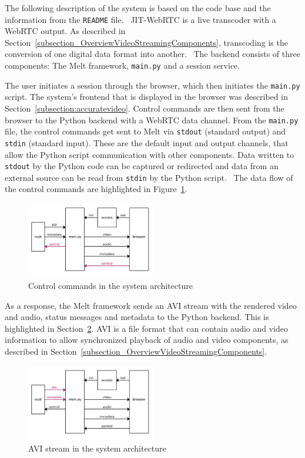 \documentclass[../MasterThesis.tex]{subfiles}
\begin{document}
The following description of the system is based on the code base and the information from the \texttt{README} file.~\cite{RM_Backend}
JIT-WebRTC is a live transcoder with a WebRTC output. As described in Section~\ref{subsection_OverviewVideoStreamingComponents}, transcoding is the conversion of one digital data format into another.~\cite{transcoding}
The backend consists of three components: The Melt framework, \texttt{main.py} and a session service.


The user initiates a session through the browser, which then initiates the \texttt{main.py} script. The system's frontend that is displayed in the browser was described in Section~\ref{subsection:accuratevideo}.
Control commands are then sent from the browser to the Python backend with a WebRTC data channel.
From the \texttt{main.py} file, the control commands get sent to Melt via \texttt{stdout} (standard output) and \texttt{stdin} (standard input). These are the default input and output channels, that allow the Python script communication with other components.
Data written to \texttt{stdout} by the Python code can be captured or redirected and data from an external source can be read from \texttt{stdin} by the Python script.~\cite{python} The data flow of the control commands are highlighted in Figure~\ref{figure:controlcommands}.

\begin{figure}[H]
	\centering
	\includegraphics[width=0.5\textwidth]{IM_control.png}
	\caption{Control commands in the system architecture}
	\label{figure:controlcommands}
\end{figure}


As a response, the Melt framework sends an AVI stream with the rendered video and audio, status messages and metadata to the Python backend. This is highlighted in Section~\ref{figure:avimetadata}.
AVI is a file format that can contain audio and video information to allow synchronized playback of audio and video components, as described in Section~\ref{subsection_OverviewVideoStreamingComponents}.~\cite{avi} 

\begin{figure}[H]
	\centering
	\includegraphics[width=0.5\textwidth]{IM_avi.png}
	\caption{AVI stream in the system architecture}
	\label{figure:avimetadata}
\end{figure}
\end{document}
